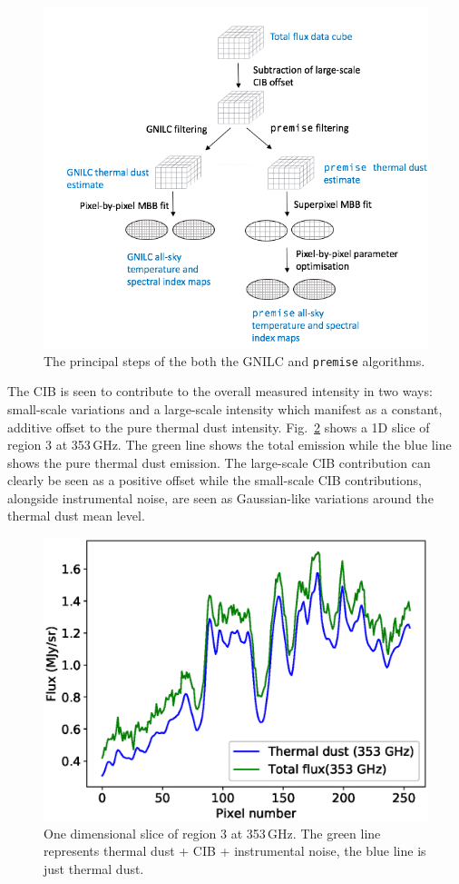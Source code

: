 \documentclass[a4paper,fleqn,usenatbib]{mnras}
\begin{document}
\begin{figure}
\centering
\includegraphics[width=0.99\linewidth]{methodDiagram}
\caption{The principal steps of the both the GNILC and {\texttt{premise}} algorithms.}
\label{fig:methFlo}
\end{figure}

The CIB is seen to contribute to the overall measured intensity in two ways: small-scale variations and a large-scale intensity which manifest as a constant, additive offset to the pure thermal dust intensity. Fig.~\ref{fig:ciboffset} shows a 1D slice of region 3 at 353\,GHz. The green line shows the total emission while the blue line shows the pure thermal dust emission. The large-scale CIB contribution can clearly be seen as a positive offset while the small-scale CIB contributions, alongside instrumental noise, are seen as Gaussian-like variations around the thermal dust mean level. 

\begin{figure}
\centering
\includegraphics[width=0.8\linewidth]{ciboffset353face6}
\caption{One dimensional slice of region 3 at 353\,GHz. The green line represents thermal dust + CIB + instrumental noise, the blue line is just thermal dust.}
\label{fig:ciboffset}
\end{figure}
\end{document}
